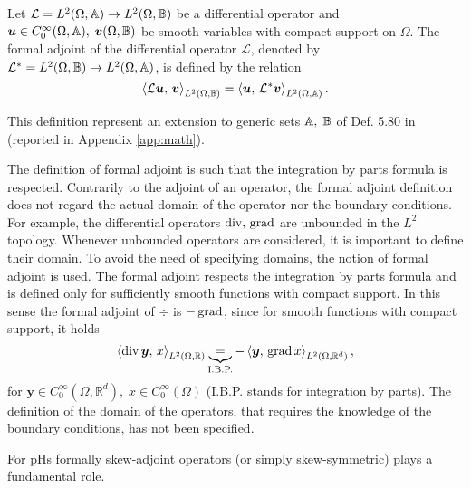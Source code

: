 \begin{definition}
Let $\mathcal{L}= L^2(\Omega, \bbA) \rightarrow L^2(\Omega, \bbB)$ be a differential operator and  $\bm{u} \in C_0^\infty(\Omega, \bbA), \; \bm{v}(\Omega, \bbB)$ be smooth variables with compact support on $\Omega$. The formal adjoint of the differential operator $\mathcal{L}$, denoted by $\mathcal{L}^*= L^2(\Omega, \bbB) \rightarrow L^2(\Omega, \bbA)$, is defined by the relation
\begin{equation}
\inner[L^2(\Omega, \bbB)]{\mathcal{L}\bm{u}}{\bm{v}} = \inner[L^2(\Omega, \bbA)]{\bm{u}}{\mathcal{L}^*\bm{v}}.
\end{equation}{}
\end{definition}
This definition represent an extension to generic sets $\bbA, \; \bbB$ of Def. 5.80 in \cite{rogers2004pde} (reported in Appendix \ref{app:math}). 

\begin{remark}
	The definition of formal adjoint is such that the integration by parts formula is respected. Contrarily to the adjoint of an operator, the formal adjoint definition does not regard the actual domain of the operator nor the boundary conditions. For example, the differential operators $\div,\, \grad$ are unbounded in the ${L}^2$ topology. Whenever unbounded operators are considered, it is important to define their domain. To avoid the need of specifying domains, the notion of formal adjoint is used. The formal adjoint respects the integration by parts formula and is defined only for sufficiently smooth functions with compact support. In this sense the formal adjoint of $\div$  is $-\grad$, since for smooth functions with compact support, it holds
	\begin{equation*}
	\inner[{L}^2(\Omega, \mathbb{R})]{\div \bm{y}}{x}
	\underbrace{=}_{\text{I.B.P.}} -\inner[{L}^2(\Omega, \mathbb{R}^{d})]{\bm{y}}{\grad {x}},
	\end{equation*}
	for $\bm{y} \in C_0^\infty(\Omega, \mathbb{R}^{d}), \; {x} \in C_0^\infty(\Omega)$ (I.B.P. stands for integration by parts). The definition of the domain of the operators, that requires the knowledge of the boundary conditions, has not been specified. 
\end{remark}

For pHs formally skew-adjoint operators (or simply skew-symmetric) plays a fundamental role.

